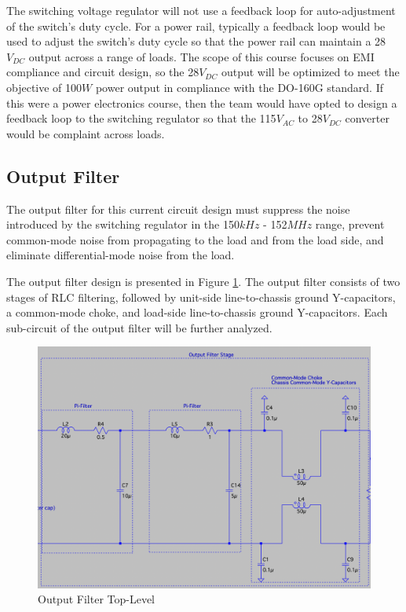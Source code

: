 \documentclass[conference]{IEEEtran}
\begin{document}
The switching voltage regulator will not use a feedback loop for auto-adjustment of the switch's duty cycle. For a power rail, typically a feedback loop would be used to adjust the switch's duty cycle so that the power rail can maintain a 28$V_{DC}$ output across a range of loads. The scope of this course focuses on EMI compliance and circuit design, so the 28$V_{DC}$ output will be optimized to meet the objective of 100$W$ power output in compliance with the DO-160G standard. If this were a power electronics course, then the team would have opted to design a feedback loop to the switching regulator so that the 115$V_{AC}$ to 28$V_{DC}$ converter would be complaint across loads.

\subsection{Output Filter}
The output filter for this current circuit design must suppress the noise introduced by the switching regulator in the 150${kHz}$ - 152${MHz}$ range, prevent common-mode noise from propagating to the load and from the load side, and eliminate differential-mode noise from the load. 

The output filter design is presented in Figure \ref{fig:output_filter_top_level_diagram}. The output filter consists of two stages of RLC filtering, followed by unit-side line-to-chassis ground Y-capacitors, a common-mode choke, and load-side line-to-chassis ground Y-capacitors. Each sub-circuit of the output filter will be further analyzed.

\begin{figure}[htp]
    \centering
    \includegraphics[width=1.0\linewidth]{output_filter_top_level.png}
    \caption{Output Filter Top-Level}
    \label{fig:output_filter_top_level_diagram}
\end{figure}
\end{document}
